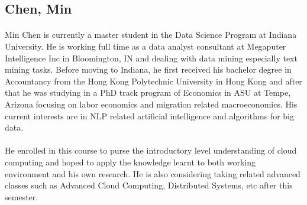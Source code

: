 \subsection{Chen, Min}
\paragraph{}
Min Chen is currently a master student in the Data Science Program at Indiana University. He is working
full time as a data analyst consultant at Megaputer Intelligence Inc in Bloomington, IN and dealing with data mining
especially text mining tasks. Before moving to Indiana, he first received his bachelor degree in Accountancy from the
Hong Kong Polytechnic University in Hong Kong and after that he was studying in a PhD track program of Economics in ASU
at Tempe, Arizona focusing on labor economics and migration related macroeconomics. His current interests are in NLP
related artificial intelligence and algorithms for big data.
\paragraph{}
He enrolled in this course to purse the introductory level understanding of cloud computing and hoped to apply the
knowledge learnt to both working environment and his own research. He is also considering taking related advanced
classes such as Advanced Cloud Computing, Distributed Systems, etc after this semester.